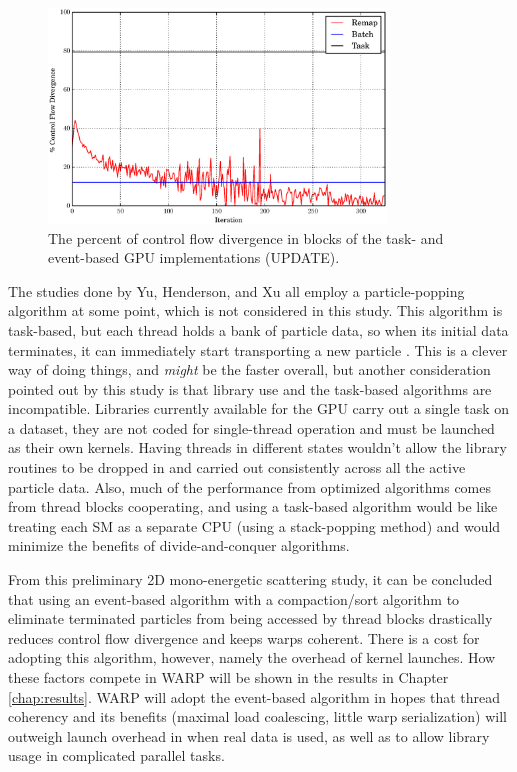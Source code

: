 \begin{figure}[h!] 
  \centering
    \includegraphics[width=0.8\textwidth]{graphics/prelim_divergence.eps}
     \caption{The percent of control flow divergence in blocks of the task- and event-based GPU implementations (UPDATE). \label{prelim_divergence} }
\end{figure}

The studies done by Yu, Henderson, and Xu all employ a particle-popping algorithm at some point, which is not considered in this study.  This algorithm is task-based, but each thread holds a bank of particle data, so when its initial data terminates, it can immediately start transporting a new particle \cite{tianyu, henderson, qixu}.  This is a clever way of doing things, and \emph{might} be the faster overall, but another consideration pointed out by this study is that library use and the task-based algorithms are incompatible.  Libraries currently available for the GPU carry out a single task on a dataset, they are not coded for single-thread operation and must be launched as their own kernels.  Having threads in different states wouldn't allow the library routines to be dropped in and carried out consistently across all the active particle data.  Also, much of the performance from optimized algorithms comes from thread blocks cooperating, and using a task-based algorithm would be like treating each SM as a separate CPU (using a stack-popping method) and would minimize the benefits of divide-and-conquer algorithms.

From this preliminary 2D mono-energetic scattering study, it can be concluded that using an event-based algorithm with a compaction/sort algorithm to eliminate terminated particles from being accessed by thread blocks drastically reduces control flow divergence and keeps warps coherent.  There is a cost for adopting this algorithm, however, namely the overhead of kernel launches.  How these factors compete in WARP will be shown in the results in Chapter \ref{chap:results}.  WARP will adopt the event-based algorithm in hopes that thread coherency and its benefits (maximal load coalescing, little warp serialization) will outweigh launch overhead in when real data is used, as well as to allow library usage in complicated parallel tasks.

